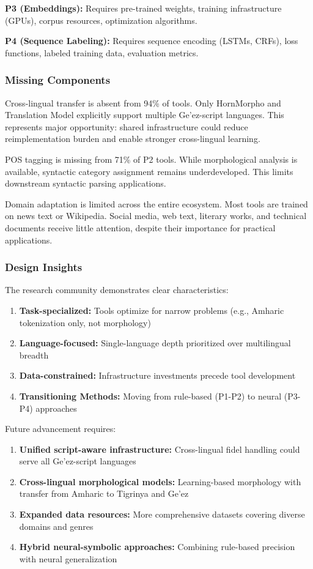 \documentclass[12pt,a4paper]{article}
\theoremstyle{plain}
\theoremstyle{definition}
\begin{document}
\textbf{P3 (Embeddings):} Requires pre-trained weights, training infrastructure (GPUs), corpus resources, optimization algorithms.

\textbf{P4 (Sequence Labeling):} Requires sequence encoding (LSTMs, CRFs), loss functions, labeled training data, evaluation metrics.

\subsubsection{Missing Components}

Cross-lingual transfer is absent from 94\% of tools. Only HornMorpho and Translation Model explicitly support multiple Ge'ez-script languages. This represents major opportunity: shared infrastructure could reduce reimplementation burden and enable stronger cross-lingual learning.

POS tagging is missing from 71\% of P2 tools. While morphological analysis is available, syntactic category assignment remains underdeveloped. This limits downstream syntactic parsing applications.

Domain adaptation is limited across the entire ecosystem. Most tools are trained on news text or Wikipedia. Social media, web text, literary works, and technical documents receive little attention, despite their importance for practical applications.

\subsubsection{Design Insights}

The research community demonstrates clear characteristics:

\begin{enumerate}
\item \textbf{Task-specialized:} Tools optimize for narrow problems (e.g., Amharic tokenization only, not morphology)
\item \textbf{Language-focused:} Single-language depth prioritized over multilingual breadth
\item \textbf{Data-constrained:} Infrastructure investments precede tool development
\item \textbf{Transitioning Methods:} Moving from rule-based (P1-P2) to neural (P3-P4) approaches
\end{enumerate}

Future advancement requires:

\begin{enumerate}
\item \textbf{Unified script-aware infrastructure:} Cross-lingual fidel handling could serve all Ge'ez-script languages
\item \textbf{Cross-lingual morphological models:} Learning-based morphology with transfer from Amharic to Tigrinya and Ge'ez
\item \textbf{Expanded data resources:} More comprehensive datasets covering diverse domains and genres
\item \textbf{Hybrid neural-symbolic approaches:} Combining rule-based precision with neural generalization
\end{enumerate}
\end{document}
